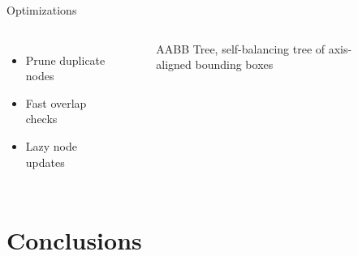 \documentclass{beamer}
\begin{document}
    \begin{frame}{Optimizations}
        \begin{columns}[onlytextwidth,T]
        \column{\dimexpr\linewidth-65mm-5mm}
            \begin{itemize}
                \item Prune duplicate nodes
                \item Fast overlap checks
                \item Lazy node updates
            \end{itemize}
        \column{65mm}
            \begin{figure}[h]
                \resizebox*{\columnwidth}{!}{%
                
                }
                \caption*{AABB Tree, self-balancing tree of axis-aligned bounding boxes}
            \end{figure}
        \end{columns}
    \end{frame}

    \section{Conclusions}
\end{document}
